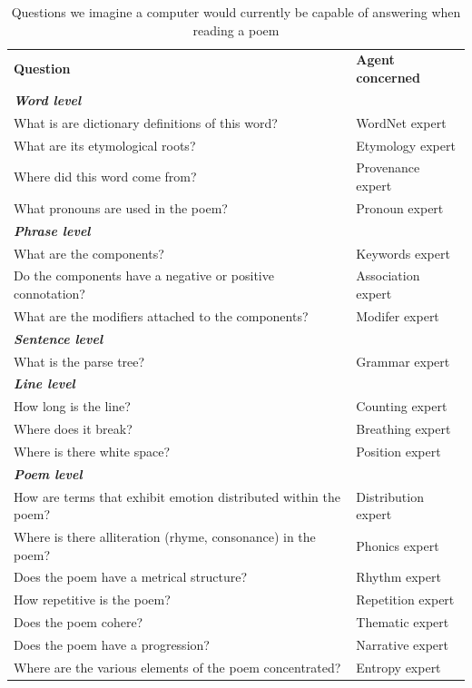 


\begin{table}[t]
{\small
\def\arraystretch{1.1}
\begin{tabular}{p{1.8in}p{1in}}
\textbf{Question} & \textbf{Agent concerned} \\[.1cm]
\textbf{\emph{Word level}} & \\
What is are dictionary definitions of this word? & WordNet expert \\
What are its etymological roots? & Etymology expert \\
Where did this word come from? & Provenance expert \\
What pronouns are used in the poem? & Pronoun expert\\[.2cm]
\textbf{\emph{Phrase level}} & \\
What are the components? & Keywords expert \\
Do the components have a negative or positive connotation? & Association expert \\
What are the modifiers attached to the components? & Modifer expert \\[.5cm]
\textbf{\emph{Sentence level}} & \\
What is the parse tree? & Grammar expert \\[.2cm]
\textbf{\emph{Line level}} & \\
How long is the line? & Counting expert \\
Where does it break? & Breathing expert \\
Where is there white space? & Position expert\\[.2cm]
\textbf{\emph{Poem level}} & \\
How are terms that exhibit emotion distributed within the poem? & Distribution expert\\
Where is there alliteration (rhyme, consonance) in the poem? & Phonics expert \\
Does the poem have a metrical structure? & Rhythm expert \\
How repetitive is the poem? & Repetition expert \\
Does the poem cohere? & Thematic expert \\
Does the poem have a progression? & Narrative expert \\
Where are the various elements of the poem concentrated? & Entropy expert 
\end{tabular}
}
\caption{Questions we imagine a computer would currently be capable of answering when reading a poem\label{tab:questions_for_computational_agents}}
\end{table}

